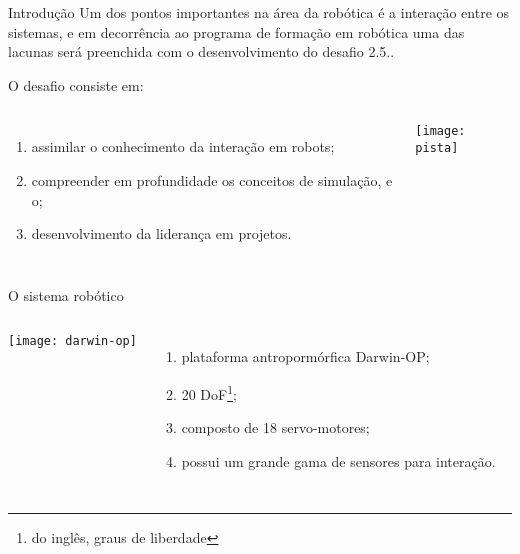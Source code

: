 \begin{frame}[t]{Introdução} 
    \transdissolve[duration=0.5]
    Um dos pontos importantes na área da robótica é a interação entre os sistemas, e em decorrência ao programa de formação em robótica uma das lacunas será preenchida com o desenvolvimento do desafio 2.5..

    O desafio consiste em:
    \newline
        \begin{columns}[c]
                \begin{enumerate}
                    \item assimilar o conhecimento da interação em robots;
                    \item compreender em profundidade os conceitos de simulação, e o;
                    \item desenvolvimento da liderança em projetos.
                \end{enumerate}
                \texttt{[image: pista]}
        \end{columns}
\end{frame}
\begin{frame}[t]{O sistema robótico}
    \transboxout[duration=0.5]
    \begin{columns}
            \texttt{[image: darwin-op]}
            \begin{enumerate}
                \item plataforma antropormórfica Darwin-OP;
                \item 20 DoF\footnote{do inglês, graus de liberdade};
                \item composto de 18 servo-motores;
                \item possui um grande gama de sensores para interação.
            \end{enumerate}
    \end{columns}
\end{frame}
